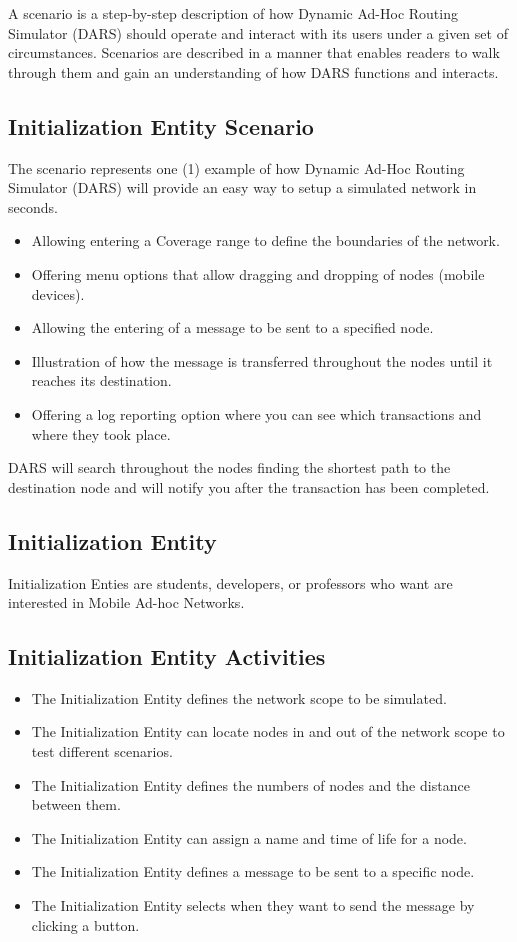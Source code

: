 \documentclass[a4paper,11pt,titlepage]{article}
\begin{document}
A scenario is a step-by-step description of how Dynamic Ad-Hoc Routing Simulator (DARS) should operate and interact with its users under a given set of circumstances. Scenarios are described in a manner that enables readers to walk through them and gain an understanding of how DARS functions and interacts.
 
\subsection{Initialization Entity Scenario}
The scenario represents one (1) example of how Dynamic Ad-Hoc Routing Simulator (DARS) will provide an easy way to setup a simulated network in seconds.
\begin{itemize}
  \item Allowing entering a Coverage range to define the boundaries of the network.
  \item Offering menu options that allow dragging and dropping of nodes (mobile devices).
  \item Allowing the entering of a message to be sent to a specified node.
  \item Illustration of how the message is transferred throughout the nodes until it reaches its destination.
  \item Offering a log reporting option where you can see which transactions and where they took place.
\end{itemize} 

DARS will search throughout the nodes finding the shortest path to the destination node and will notify you after the transaction has been completed.
 
\subsection{Initialization Entity}
Initialization Enties are students, developers, or professors who want are interested in Mobile Ad-hoc Networks.
 
\subsection{Initialization Entity Activities}
\begin{itemize}
  \item The Initialization Entity defines the network scope to be simulated.
  \item The Initialization Entity can locate nodes in and out of the network scope to test different scenarios.
  \item The Initialization Entity defines the numbers of nodes and the distance between them.
  \item The Initialization Entity can assign a name and time of life for a node.
  \item The Initialization Entity defines a message to be sent to a specific node.
  \item The Initialization Entity selects when they want to send the message by clicking a button.
\end{itemize} 
 
\end{document}

